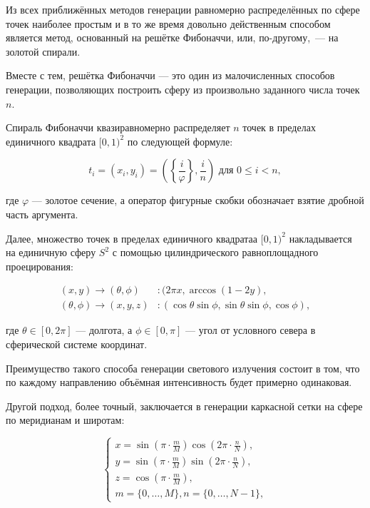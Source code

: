Из всех приближённых методов генерации равномерно распределённых по сфере точек наиболее простым и в то же время довольно действенным способом является метод, основанный на решётке Фибоначчи, или, по-другому,~— на золотой спирали.

Вместе с тем, решётка Фибоначчи — это один из малочисленных способов генерации, позволяющих построить сферу из произвольно заданного числа точек $n$.

Спираль Фибоначчи квазиравномерно распределяет $n$ точек в пределах единичного квадрата $[0, 1)^2$ по следующей формуле:

\begin{equation}
	t_i = (x_i, y_i) = \left(\left\{\frac{i}{\varphi}\right\}, \frac{i}{n}\right) \text{ для } 0 \leqslant i < n,
\end{equation}

\noindent где $\varphi$ — золотое сечение, а оператор фигурные скобки обозначает взятие дробной часть аргумента.

Далее, множество точек в пределах единичного квадратаа $[0, 1)^2$ накладывается на единичную сферу $S^2$ с помощью цилиндрического равноплощадного проецирования:

\begin{align}
	(x, y) \to (\theta, \phi)&\colon (2 \pi x, \arccos{(1 - 2y)}, \\
	(\theta, \phi) \to (x, y, z)&\colon (\cos\theta \sin\phi, \sin\theta \sin\phi, \cos\phi),
\end{align}

\noindent где $\theta \in [0, 2\pi]$ — долгота, а $\phi \in [0, \pi]$ — угол от условного севера в сферической системе координат.

Преимущество такого способа генерации светового излучения состоит в том, что по каждому направлению объёмная интенсивность будет примерно одинаковая.

Другой подход, более точный, заключается в генерации каркасной сетки на сфере по меридианам и широтам:

\begin{equation}
	\begin{cases}
		x = \sin{\left(\pi \cdot \frac mM\right)}\cos{\left(2\pi \cdot \frac nN\right)}, \\
		y = \sin{\left(\pi \cdot \frac mM\right)}\sin{\left(2\pi \cdot \frac nN\right)}, \\
		z = \cos{\left(\pi \cdot \frac mM\right)}, \\
		m = \{0, \ldots, M\}, n = \{0, \ldots, N-1\},
	\end{cases}
\end{equation}

